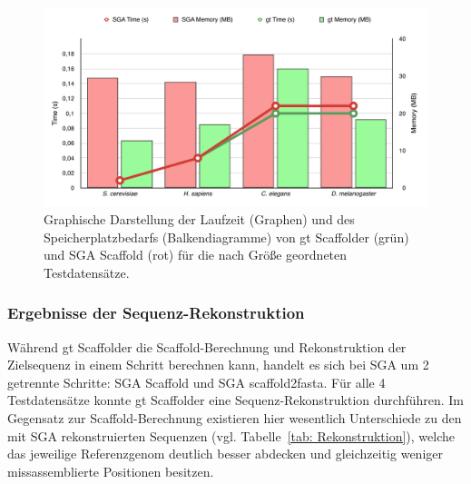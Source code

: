 \documentclass[a4paper,11pt,parskip]{scrartcl}
\begin{document}
\begin{figure}[t]
  \includegraphics[width=\textwidth,height=0.8\textheight,keepaspectratio]{presentation/figures/sga_vs_gt.pdf}
  \caption{\label{abb: Zeit}Graphische Darstellung der Laufzeit (Graphen) und
  des Speicherplatzbedarfs (Balkendiagramme) von gt Scaffolder (grün) und SGA
  Scaffold (rot) für die nach Größe geordneten Testdatensätze.}
\end{figure}


\subsubsection*{Ergebnisse der Sequenz-Rekonstruktion}
\label{sec: Seq-Rek}
Während gt Scaffolder die Scaffold-Berechnung und Rekonstruktion der Zielsequenz
in einem Schritt berechnen kann, handelt es sich bei SGA um 2 getrennte
Schritte: SGA Scaffold und SGA scaffold2fasta. Für alle 4 Testdatensätze konnte
gt Scaffolder eine Sequenz-Rekonstruktion durchführen. Im Gegensatz zur
Scaffold-Berechnung existieren hier wesentlich Unterschiede zu den mit SGA
rekonstruierten Sequenzen (vgl. Tabelle~\ref{tab: Rekonstruktion}), welche das
jeweilige Referenzgenom deutlich besser abdecken und gleichzeitig weniger
missassemblierte Positionen besitzen.
\end{document}

